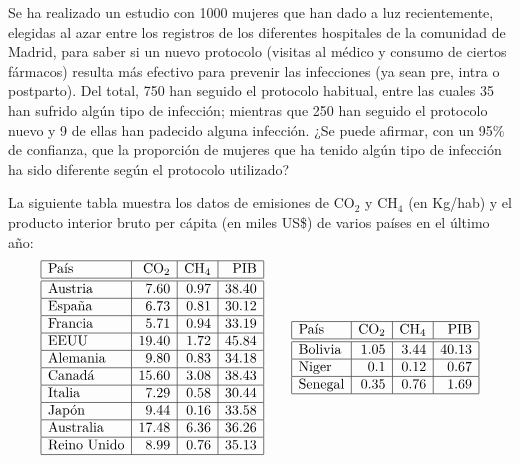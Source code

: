 {Se ha realizado un estudio con 1000 mujeres que han dado a luz recientemente, elegidas al azar entre los registros de
los diferentes hospitales de la comunidad de Madrid, para saber si un nuevo protocolo (visitas al médico y consumo de
ciertos fármacos) resulta más efectivo para prevenir las infecciones (ya sean pre, intra o postparto).
Del total, 750 han seguido el protocolo habitual, entre las cuales 35 han sufrido algún tipo de infección; mientras
que 250 han seguido el protocolo nuevo y 9 de ellas han padecido alguna infección.
¿Se puede afirmar, con un 95\% de confianza, que la proporción de mujeres que ha tenido algún tipo de infección ha
sido diferente según el protocolo utilizado?
}
{}
{}


{La siguiente tabla muestra los datos de emisiones de CO$_2$ y CH$_4$ (en Kg/hab) y el producto interior bruto per
cápita (en miles US\$) de varios países en el último año:
\[
\begin{array}{|l|r|r|r|}
\hline
\mbox{País} & \mbox{CO}_2 & \mbox{CH}_4 & \mbox{PIB}\\
\hline\hline
\mbox{Austria}     & 7.60 & 0.97 & 38.40\\ \hline
\mbox{España}      & 6.73 & 0.81	& 30.12\\ \hline
\mbox{Francia}     & 5.71 & 0.94	& 33.19\\ \hline
\mbox{EEUU}        &19.40 & 1.72	&	45.84\\ \hline
\mbox{Alemania}    & 9.80 & 0.83	& 34.18\\ \hline
\mbox{Canadá}      &15.60 & 3.08	& 38.43\\ \hline
\mbox{Italia}      & 7.29 & 0.58	& 30.44\\ \hline
\mbox{Japón}       &	9.44 & 0.16	& 33.58\\ \hline
\mbox{Australia}   &17.48 & 6.36	& 36.26\\ \hline
\mbox{Reino Unido} & 8.99 & 0.76	& 35.13\\ \hline
\end{array}
\qquad
\begin{array}{|l|r|r|r|}
\hline
\mbox{País} & \mbox{CO}_2 & \mbox{CH}_4 & \mbox{PIB}\\
\hline\hline
\mbox{Bolivia}     & 1.05 & 3.44	& 40.13\\ \hline
\mbox{Niger}       &	0.1	 & 0.12	&	 0.67\\ \hline
\mbox{Senegal}     &	0.35 & 0.76 &  1.69\\ \hline

\end{array}\]}

